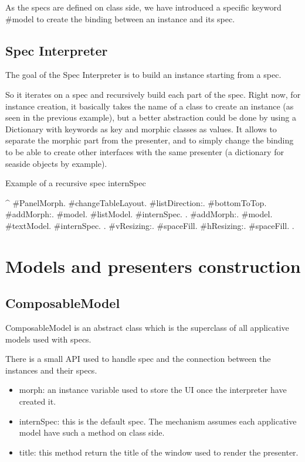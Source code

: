 \documentclass[a4paper,10pt,twoside]{book}
\begin{document}
As the specs are defined on class side, we have introduced a specific keyword \#model to create the binding between an instance and its spec.

\subsection{Spec Interpreter}

The goal of the Spec Interpreter is to build an instance starting from a spec.

So it iterates on a spec and recursively build each part of the spec.
Right now, for instance creation, it basically takes the name of a class to create an instance (as seen in the previous example), but a better abstraction could be done by using a Dictionary with keywords as key and morphic classes as values. It allows to separate the morphic part from the presenter, and to simply change the binding to be able to create other interfaces with the same presenter (a dictionary for seaside objects by example).

\begin{method}{Example of a recursive spec}
internSpec

	^	{  #PanelMorph.
			#changeTableLayout.
			#listDirection:. #bottomToTop.
			#addMorph:.   { #model. #listModel. #internSpec.	 }.
			#addMorph:.	  { #model. #textModel. #internSpec. 	}.
			#vResizing:. 	#spaceFill.
			#hResizing:. 	#spaceFill.	}.
\end{method} 

\section{Models and presenters construction}

\subsection{ComposableModel}

ComposableModel is an abstract class which is the superclass of all applicative models used with specs.

There is a small API used to handle spec and the connection between the instances and their specs.

\begin{itemize}
	\item morph: an instance variable used to store the UI once the interpreter have created it.
	\item internSpec: this is the default spec. The mechanism assumes each applicative model have such a method on class side.
	\item title: this method return the title of the window used to render the presenter.
\end{itemize}
\end{document}
